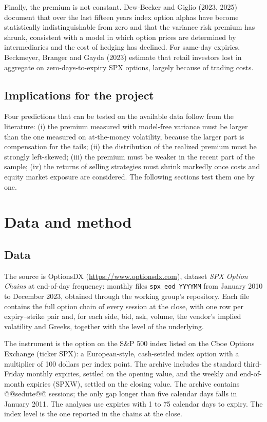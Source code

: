\documentclass[11pt,a4paper]{article}
\begin{document}
Finally, the premium is not constant. Dew-Becker and Giglio (2023, 2025) document that over the last fifteen years index option alphas have become statistically indistinguishable from zero and that the variance risk premium has shrunk, consistent with a model in which option prices are determined by intermediaries and the cost of hedging has declined. For same-day expiries, Beckmeyer, Branger and Gayda (2023) estimate that retail investors lost in aggregate on zero-days-to-expiry SPX options, largely because of trading costs.

\subsection{Implications for the project}

Four predictions that can be tested on the available data follow from the literature: (i) the premium measured with model-free variance must be larger than the one measured on at-the-money volatility, because the larger part is compensation for the tails; (ii) the distribution of the realized premium must be strongly left-skewed; (iii) the premium must be weaker in the recent part of the sample; (iv) the returns of selling strategies must shrink markedly once costs and equity market exposure are considered. The following sections test them one by one.

\section{Data and method}\label{sec:dati}

\subsection{Data}

The source is OptionsDX (\url{https://www.optionsdx.com}), dataset \emph{SPX Option Chains} at end-of-day frequency: monthly files \texttt{spx\_eod\_YYYYMM} from January 2010 to December 2023, obtained through the working group's repository. Each file contains the full option chain of every session at the close, with one row per expiry--strike pair and, for each side, bid, ask, volume, the vendor's implied volatility and Greeks, together with the level of the underlying.

The instrument is the option on the S\&P 500 index listed on the Cboe Options Exchange (ticker SPX): a European-style, cash-settled index option with a multiplier of 100 dollars per index point. The archive includes the standard third-Friday monthly expiries, settled on the opening value, and the weekly and end-of-month expiries (SPXW), settled on the closing value. The archive contains @@sedute@@ sessions; the only gap longer than five calendar days falls in January 2011. The analyses use expiries with 1 to 75 calendar days to expiry. The index level is the one reported in the chains at the close.
\end{document}
